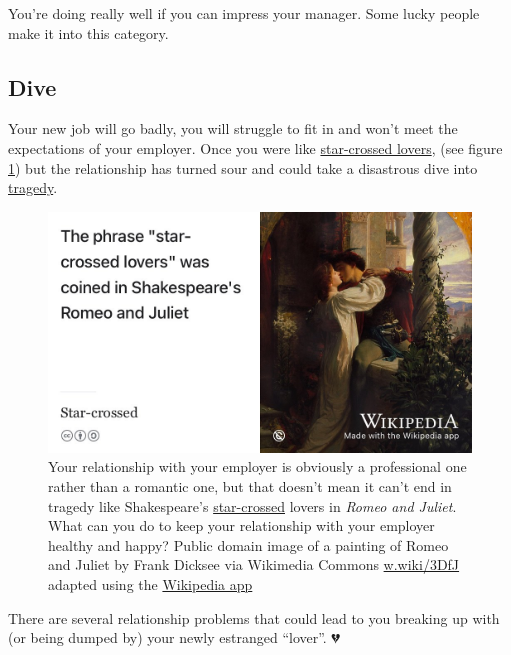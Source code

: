 \documentclass[
]{book}
\begin{document}
You're doing really well if you can impress your manager. Some lucky people make it into this category.

\hypertarget{dive}{%
\subsection{Dive}\label{dive}}

Your new job will go badly, you will struggle to fit in and won't meet the expectations of your employer. Once you were like \href{https://en.wikipedia.org/wiki/Star-crossed}{star-crossed lovers}, (see figure \ref{fig:romeo-fig}) but the relationship has turned sour and could take a disastrous dive into \href{https://en.wikipedia.org/wiki/Tragedy}{tragedy}. \citep{romeo, goblewroe}

\begin{figure}

{\centering \includegraphics[width=1\linewidth]{images/star-crossed-lovers} 

}

\caption{Your relationship with your employer is obviously a professional one rather than a romantic one, but that doesn't mean it can't end in tragedy like Shakespeare's \href{https://en.wikipedia.org/wiki/Star-crossed}{star-crossed} lovers in \emph{Romeo and Juliet}. \citep{romeo} What can you do to keep your relationship with your employer healthy and happy? Public domain image of a painting of Romeo and Juliet by Frank Dicksee via Wikimedia Commons \href{https://w.wiki/3DfJ}{w.wiki/3DfJ} adapted using the \href{https://apps.apple.com/gb/app/wikipedia/id324715238}{Wikipedia app}}\label{fig:romeo-fig}
\end{figure}



There are several relationship problems that could lead to you breaking up with (or being dumped by) your newly estranged ``lover''. 💔
\end{document}
